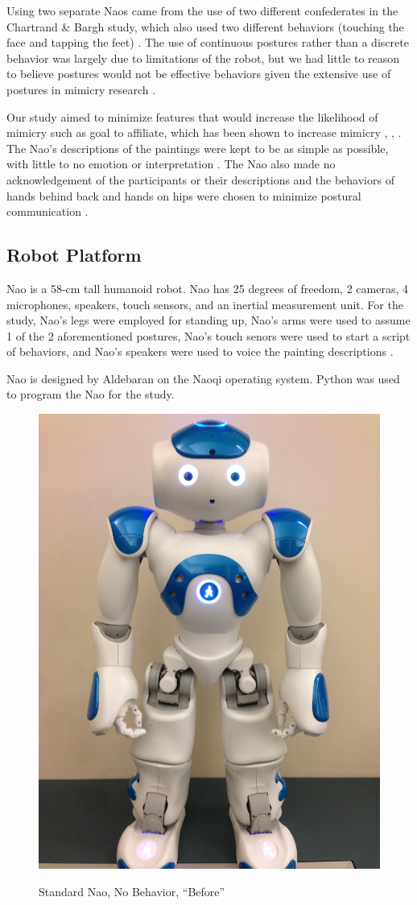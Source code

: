 \documentclass{acm_proc_article-sp}
\begin{document}
Using two separate Naos came from the use of two different confederates in  the Chartrand \& Bargh study, which also used two different behaviors (touching the face and tapping the feet) \cite{chartrand1999chameleon}. The use of continuous postures rather than a discrete behavior was largely due to limitations of the robot, but we had little to reason to believe postures would not be effective behaviors given the extensive use of postures in mimicry research \cite{chartrand2013antecedents}. 

Our study aimed to minimize features that would increase the likelihood of mimicry such as goal to affiliate, which has been shown to increase mimicry \cite{chartrand2013antecedents}, \cite{drury2006effects}, \cite{lakin2003using}. The Nao's descriptions of the paintings were kept to be as simple as possible, with little to no emotion or interpretation \cite{hofree2014bridging}. The Nao also made no acknowledgement of the participants or their descriptions and the behaviors of hands behind back and hands on hips were chosen to minimize postural communication . 

\subsection{Robot Platform}
Nao is a 58-cm tall humanoid robot. Nao has 25 degrees of freedom, 2 cameras, 4 microphones, speakers, touch sensors, and an inertial measurement unit. For the study, Nao's legs were employed for standing up, Nao's arms were used to assume 1 of the 2 aforementioned postures, Nao's touch senors were used to start a script of behaviors, and Nao's speakers were used to voice the painting descriptions \cite{naodocumentation}. 

Nao is designed by Aldebaran on the Naoqi operating system. Python was used to program the Nao for the study. 

\begin{figure}[t!]
\centering
 \includegraphics[width=0.65\linewidth]{normal3.jpg}\\
 \caption{Standard Nao, No Behavior, ``Before''}
 \label{f:bert}%
\end{figure}
\end{document}
